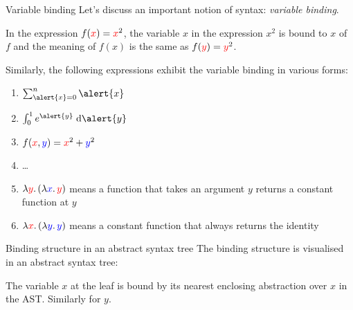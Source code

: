 \begin{frame}{Variable binding}
  Let's discuss an important notion of syntax: \emph{variable binding}.

  In the expression $f({\color{red}{x}}) = {\color{red}x}^2$, the variable $x$ in the expression $x^2$ is \alert{bound} to $x$ of $f$ and the \alert{meaning} of $f(x)$ is the same as $f({\color{red}y}) = {\color{red}y}^2$.

  Similarly, the following expressions exhibit the variable binding in various forms:
  \begin{enumerate}
    \item $\sum_{\alert{x} = 0}^{n} \alert{x}$
    \item $\int_{0}^{1} e^{\alert{y}}\; \mathrm{d}\alert{y}$
    \item $f({\color{red}x}, {\color{blue}y}) = {\color{red}x}^2 + {\color{blue}y}^2$
    \item \dots
    \item $\lambda {\color{red}y}.\,(\lambda {\color{blue}x}.\, {\color{red}y})$ means a function that takes an argument $y$ returns a constant function at $y$
    \item $\lambda {\color{red}x}.\,(\lambda {\color{blue}y}.\, {\color{blue}y})$ means a constant function that always returns the identity
  \end{enumerate}
\end{frame}

\begin{frame}{Binding structure in an abstract syntax tree}
  The binding structure is visualised in an abstract syntax tree:
  \begin{center}
  \end{center}
  The variable $x$ at the leaf is bound by its nearest enclosing abstraction over $x$ in the AST.
  Similarly for $y$.
\end{frame}

